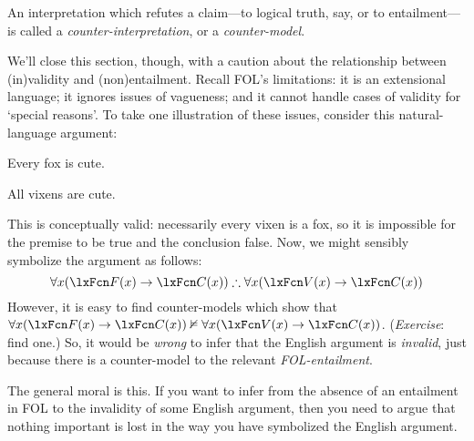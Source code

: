 An interpretation which refutes a claim---to logical truth, say, or to entailment---is called a \emph{counter-interpretation}, or a \emph{counter-model}.

We'll close this section, though, with a caution about the relationship between (in)validity and (non)entailment. Recall FOL's limitations: it is an extensional language; it ignores issues of vagueness; and it cannot handle cases of validity for `special reasons'. To take one illustration of these issues, consider this natural-language argument: 
\begin{earg}
	\item[] Every fox is cute.
	\item[\texttherefore] All vixens are cute.
\end{earg}
This is conceptually valid: necessarily every vixen is a fox, so it is impossible for the premise to be true and the conclusion false. Now, we might sensibly symbolize the argument as follows:
$$\forall x(\atom{F}{x} \eif \atom{C}{x}) \therefore \forall x(\atom{V}{x} \eif  \atom{C}{x})$$
However, it is easy to find counter-models which show that $\forall x(\atom{F}{x} \eif \atom{C}{x}) \nentails \forall x(\atom{V}{x} \eif  \atom{C}{x})$. (\emph{Exercise}: find one.) So, it would be \emph{wrong} to infer that the English argument is \emph{invalid}, just because there is a counter-model to the relevant \emph{FOL{}-entailment}.

The general moral is this. If you want to infer from the absence of an entailment in FOL to the invalidity of some English argument, then you need to argue that nothing important is lost in the way you have symbolized the English argument.

\practiceproblems

